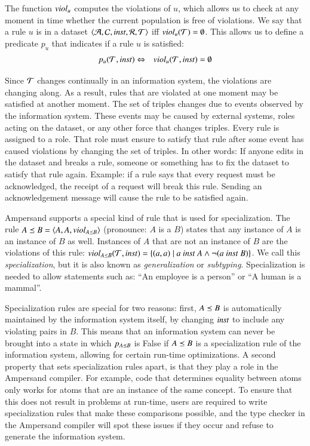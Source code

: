 \documentclass{elsarticle}
\begin{document}
   The function $\text{\it viol\/}_u$ computes the violations of $u$,
   which allows us to check at any moment in time whether the current population is free of violations.
   We say that a rule $u$ is  in a dataset $\langle\mathcal{A},\mathcal{C},\text{\it inst\/},\mathcal{R},\mathcal{T}\rangle$ iff $\text{\it viol\/}_{u}(\mathcal{T})=\emptyset$.
   This allows us to define a predicate $p_u$ that indicates if a rule $u$ is satisfied:
\begin{eqnarray}
   p_u(\mathcal{T},\text{\it inst\/})&\Leftrightarrow&\text{\it viol\/}_{u}(\mathcal{T},\text{\it inst\/})=\emptyset
\end{eqnarray}

   Since $\mathcal{T}$ changes continually in an information system, the violations are changing along.
   As a result, rules that are violated at one moment may be satisfied at another moment.
   The set of triples changes due to events observed by the information system.
   These events may be caused by external systems, roles acting on the dataset, or any other force that changes triples.
   Every rule is assigned to a role.
   That role must ensure to satisfy that rule after some event has caused violations by changing the set of triples.
   In other words: If anyone edits in the dataset and breaks a rule, someone or something has to fix the dataset to satisfy that rule again.
   Example: if a rule says that every request must be acknowledged, the receipt of a request will break this rule.
   Sending an acknowledgement message will cause the rule to be satisfied again.

   Ampersand supports a special kind of rule that is used for specialization.
   The rule $A\preceq B = \langle A, A, viol_{A\preceq B} \rangle$ (pronounce: $A$ is a $B$) states that any instance of $A$ is an instance of $B$ as well.
   Instances of $A$ that are not an instance of $B$ are the violations of this rule: $viol_{A\isa B}(\triples,\inst) = \{(a,a) \mid a\ \inst\ A \wedge \lnot (a\ \inst\ B)\}$.
   We call this {\em specialization}, but it is also known as {\em generalization} or {\em subtyping}.
   Specialization is needed to allow statements such as: ``An employee is a person'' or ``A human is a mammal''.
   
      Specialization rules are special for two reasons:
   first, $A\preceq B$ is automatically maintained by the information system itself, by changing $\text{\it inst\/}$ to include any violating pairs in $B$.
   This means that an information system can never be brought into a state in which $p_{A\preceq B}$ is False if $A\preceq B$ is a specialization rule of the information system, allowing for certain run-time optimizations.
   A second property that sets specialization rules apart, is that they play a role in the Ampersand compiler.
   For example, code that determines equality between atoms only works for atoms that are an instance of the same concept.
   To ensure that this does not result in problems at run-time, users are required to write specialization rules that make these comparisons possible, and the type checker in the Ampersand compiler will spot these issues if they occur and refuse to generate the information system.
\end{document}

